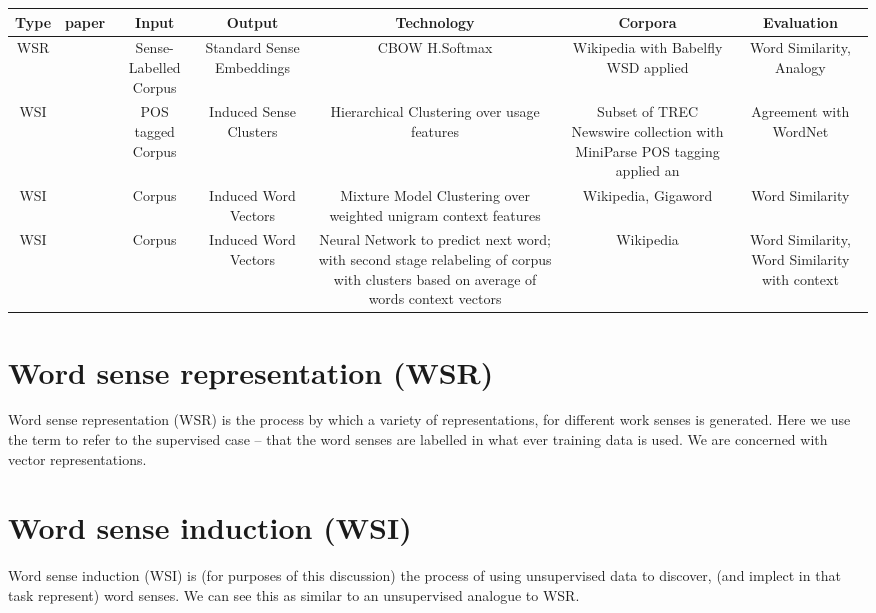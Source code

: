 \documentclass[12pt,parskip]{komatufte}
\begin{document}
\begin{table}
	\scriptsize
	
	\begin{tabulary}{\textwidth}{|C|K{1cm}|C|C|C|C|C|}
		\hline Type & paper & Input & Output & Technology & Corpora & Evaluation \\ 
		\hline  WSR & \parencite{iacobacci2015sensembed} & Sense-Labelled Corpus  & Standard Sense Embeddings & CBOW H.Softmax & Wikipedia with Babelfly WSD applied & Word Similarity, Analogy  \\ 
		\hline WSI &  \parencite{pantel2002WSI} & POS tagged Corpus  & Induced Sense Clusters & Hierarchical Clustering over usage features & Subset of TREC Newswire collection with MiniParse POS tagging applied an & Agreement with WordNet \\ 
		\hline WSI &  \parencite{Reisinger2010} & Corpus  & Induced Word Vectors & Mixture Model Clustering over weighted unigram context features & Wikipedia, Gigaword & Word Similarity \\
		\hline WSI &  \parencite{Huang2012} & Corpus  & Induced Word Vectors & Neural Network to predict next word; with second stage relabeling of corpus with clusters based on average of words context vectors & Wikipedia & Word Similarity, Word Similarity with context \\
		\hline 
	\end{tabulary} 
\end{table}

\section{Word sense representation (WSR)}
Word sense representation (WSR) is the process by which a variety of representations, for different work senses is generated.
Here we use the term to refer to the supervised case -- that the word senses are labelled in what ever training data is used.
We are concerned with vector representations.


\section{Word sense induction (WSI)}
Word sense induction (WSI) is (for purposes of this discussion) the process of using unsupervised data to discover, (and implect in that task represent) word senses.
We can see this as similar to an unsupervised analogue to WSR.
\end{document}
